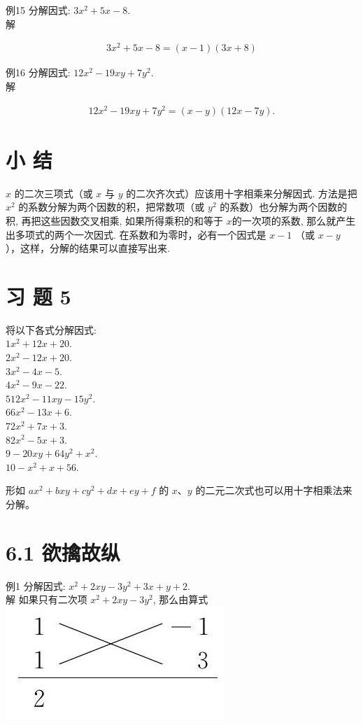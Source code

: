 \documentclass[10pt]{article}
\begin{document}
例15 分解因式: $3 x^{2}+5 x-8$.\\
解

\begin{align*}
3 x^{2}+5 x-8=(x-1)(3 x+8)
\end{align*}

例16 分解因式: $12 x^{2}-19 x y+7 y^{2}$.\\
解

\begin{align*}
12 x^{2}-19 x y+7 y^{2}=(x-y)(12 x-7 y) .
\end{align*}

\section*{小 结}
$x$ 的二次三项式（或 $x$ 与 $y$ 的二次齐次式）应该用十字相乘来分解因式. 方法是把 $x^{2}$ 的系数分解为两个因数的积，把常数项（或 $y^{2}$ 的系数）也分解为两个因数的积, 再把这些因数交叉相乘, 如果所得乘积的和等于 $x$的一次项的系数, 那么就产生出多项式的两个一次因式. 在系数和为零时，必有一个因式是 $x-1$ （或 $x-y$ ），这样，分解的结果可以直接写出来.

\section*{习 题 5}
将以下各式分解因式:\\
$1 x^{2}+12 x+20$.\\
$2 x^{2}-12 x+20$.\\
$3 x^{2}-4 x-5$.\\
$4 x^{2}-9 x-22$.\\
$512 x^{2}-11 x y-15 y^{2}$.\\
$66 x^{2}-13 x+6$.\\
$72 x^{2}+7 x+3$.\\
$82 x^{2}-5 x+3$.\\
$9-20 x y+64 y^{2}+x^{2}$.\\
$10-x^{2}+x+56$.

形如 $a x^{2}+b x y+c y^{2}+d x+e y+f$ 的 $x 、 y$ 的二元二次式也可以用十字相乘法来分解。

\section*{6.1 欲擒故纵}
例1 分解因式: $x^{2}+2 x y-3 y^{2}+3 x+y+2$.\\
解 如果只有二次项 $x^{2}+2 x y-3 y^{2}$, 那么由算式\\
\includegraphics[max width=\textwidth, center]{2024_10_30_bd799899fef40368a068g-041(1)}
\end{document}
